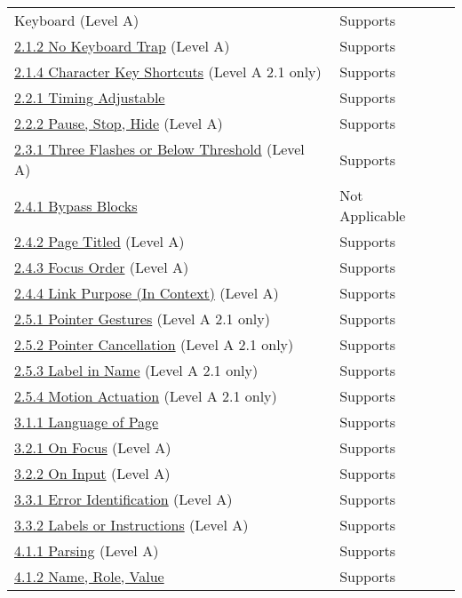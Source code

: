 \documentclass{report}
\begin{document}
\begin{longtable}{p{}<{\RaggedRight}p{}<{\RaggedRight}p{}<{\RaggedRight}}
{  Keyboard} (Level A) & Supports \\
  \href{http://www.w3.org/TR/WCAG20/#keyboard-operation-trapping}{2.1.2
  No Keyboard Trap} (Level A) & Supports \\
  \href{https://www.w3.org/TR/WCAG21/#character-key-shortcuts}{2.1.4
  Character Key Shortcuts} (Level A 2.1 only) & Supports \\
        \href{http://www.w3.org/TR/WCAG20/#time-limits-required-behaviors}{2.2.1
  Timing Adjustable} & Supports\\
  \href{http://www.w3.org/TR/WCAG20/#time-limits-pause}{2.2.2 Pause, Stop,
  Hide} (Level A) & Supports\\
  \href{http://www.w3.org/TR/WCAG20/#seizure-does-not-violate}{2.3.1
  Three Flashes or Below Threshold} (Level A) & Supports\\
  \href{http://www.w3.org/TR/WCAG20/#navigation-mechanisms-skip}{2.4.1
  Bypass Blocks} & Not Applicable\\
  \href{http://www.w3.org/TR/WCAG20/#navigation-mechanisms-title}{2.4.2 Page Titled} (Level A) & Supports\\
  \href{http://www.w3.org/TR/WCAG20/#navigation-mechanisms-focus-order}{2.4.3 Focus Order} (Level A) & Supports\\
  \href{http://www.w3.org/TR/WCAG20/#navigation-mechanisms-refs}{2.4.4 Link Purpose (In Context)} (Level A) & Supports\\
  \href{https://www.w3.org/TR/WCAG21/#pointer-gestures}{2.5.1 Pointer Gestures} (Level A 2.1 only) & Supports\\
  \href{https://www.w3.org/TR/WCAG21/#pointer-cancellation}{2.5.2
  Pointer Cancellation} (Level A 2.1 only) &  Supports\\
  \href{https://www.w3.org/TR/WCAG21/#label-in-name}{2.5.3 Label in Name} (Level A 2.1 only) & Supports\\
  \href{https://www.w3.org/TR/WCAG21/#motion-actuation}{2.5.4 Motion Actuation} (Level A 2.1 only) & Supports\\
  \href{http://www.w3.org/TR/WCAG20/#meaning-doc-lang-id}{3.1.1 Language of Page} & Supports\\
  \href{http://www.w3.org/TR/WCAG20/#consistent-behavior-receive-focus}{3.2.1 On Focus} (Level A) & Supports\\
  \href{http://www.w3.org/TR/WCAG20/#consistent-behavior-unpredictable-change}{3.2.2 On Input} (Level A) & Supports\\
  \href{http://www.w3.org/TR/WCAG20/#minimize-error-identified}{3.3.1 Error Identification} (Level A) & Supports\\
        \href{http://www.w3.org/TR/WCAG20/#minimize-error-cues}{3.3.2 Labels or Instructions} (Level A) & Supports\\
  \href{http://www.w3.org/TR/WCAG20/#ensure-compat-parses}{4.1.1 Parsing} (Level A) & Supports\\
  \href{http://www.w3.org/TR/WCAG20/#ensure-compat-rsv}{4.1.2 Name, Role, Value} & Supports\\
\end{longtable}
\end{document}
